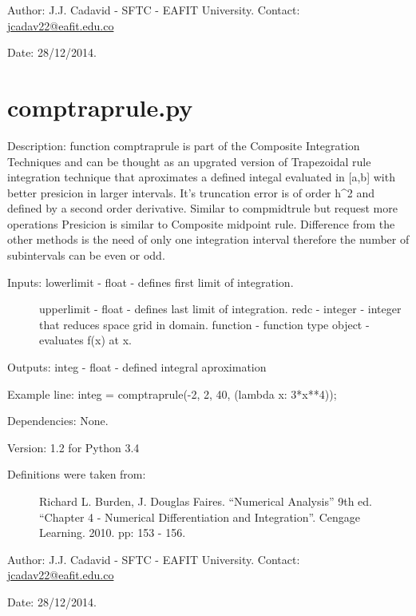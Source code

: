 \documentclass[letterpaper,10pt,oneside]{sphinxmanual}
\theoremstyle{plain}%
\theoremstyle{definition}%
\theoremstyle{remark}%
\begin{document}
Author: J.J. Cadavid - SFTC - EAFIT University.
Contact: \href{mailto:jcadav22@eafit.edu.co}{jcadav22@eafit.edu.co}

Date: 28/12/2014.


\section{comptraprule.py}
\label{code:module-comptraprule}\label{code:comptraprule-py}
Description: function comptraprule is part of the Composite Integration
Techniques and can be thought as an upgrated version of Trapezoidal rule
integration technique that aproximates a defined integal evaluated in {[}a,b{]}
with better presicion in larger intervals. It's truncation error is of order
h\textasciicircum{}2 and defined by a second order derivative. Similar to compmidtrule but
request more operations Presicion is similar to Composite midpoint rule.
Difference from the other methods is the need of only one integration interval
therefore the number of subintervals can be even or odd.
\begin{description}
\item[{Inputs: lowerlimit - float - defines first limit of integration.}] \leavevmode
upperlimit - float - defines last limit of integration.
redc - integer - integer that reduces space grid in domain.
function - function type object - evaluates f(x) at x.

\end{description}

Outputs: integ - float - defined integral aproximation

Example line: integ = comptraprule(-2, 2, 40, (lambda x: 3*x**4));

Dependencies: None.

Version: 1.2 for Python 3.4
\begin{description}
\item[{Definitions were taken from:}] \leavevmode
Richard L. Burden, J. Douglas Faires. ``Numerical Analysis'' 9th ed.
``Chapter 4 - Numerical Differentiation and Integration''. 
Cengage Learning. 2010. pp: 153 - 156.

\end{description}

Author: J.J. Cadavid - SFTC - EAFIT University.
Contact: \href{mailto:jcadav22@eafit.edu.co}{jcadav22@eafit.edu.co}

Date: 28/12/2014.
\end{document}
